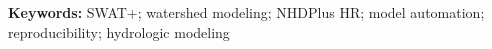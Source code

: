 \noindent\textbf{Keywords:} SWAT+; watershed modeling; NHDPlus HR; model automation; reproducibility; hydrologic modeling
